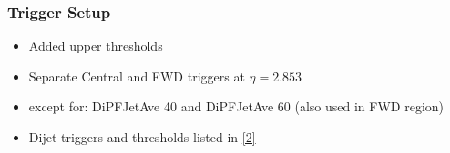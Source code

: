 \documentclass[t,compress]{beamer}
\begin{document}
 
\begin{frame}
  \frametitle{Trigger Setup}
  \vspace{-0.3cm}
\begin{itemize}
\item Added upper thresholds
\item Separate Central and FWD triggers at $\eta = 2.853$
\item except for: DiPFJetAve 40 and DiPFJetAve 60 \newline \hspace*{2cm} (also used in FWD region)
\item Dijet triggers and thresholds listed in \href{https://docs.google.com/spreadsheets/d/1LXIO3vw8RuMwBFgYUDtLmAghhFvWjs3gALRKlJxzWus/}{[2]}
 \end{itemize}
 \begin{columns}
  \begin{column}{0.5\textwidth}
  \vspace{-1.cm}
    \begin{figure}
\end{figure}
\vspace{-0.8cm}
    \begin{figure}
\end{figure}
  \end{column}
 \begin{column}{0.5\textwidth}
 \vspace{-1.cm}
   \begin{figure}
\end{figure}
\vspace{-0.8cm}
    \begin{figure}
\end{figure}
  \end{column}
 \end{columns}
 \end{frame}
 
\end{document}
